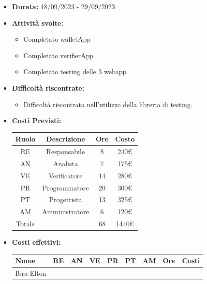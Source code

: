         \begin{itemize}
            \item \textbf{Durata:} 18/09/2023 - 29/09/2023 
            \item \textbf{Attività svolte:}
            \begin{itemize}
                \item Completato walletApp
                \item Completato verifierApp
                \item Completato testing delle 3 webapp 
                
            \end{itemize}
            \item \textbf{Difficoltà riscontrate:}
            \begin{itemize}
                \item Difficoltà riscontrata nell'utilizzo della libreria di testing. 
            \end{itemize}
            \item \textbf{Costi Previsti:}
            \begin{longtable}{|c|c|c|c|}
                \hline
                Ruolo & Descrizione & Ore & Costo \\
                \hline
                RE & Responsabile & 8 & 240€\\
                \hline
                AN & Analista & 7 &  175€\\
                \hline
                VE & Verificatore & 14 & 280€ \\
                \hline
                PR & Programmatore & 20 &  300€\\
                \hline
                PT & Progettista & 13 & 325€ \\
                \hline
                AM & Amministratore & 6 & 120€ \\
                \hline
                Totale & & 68 & 1440€ \\
                \hline
                \end{longtable}
            \item \textbf{Costi effettivi:}
            \begin{longtable}{|p{}|c|c|c|c|c|c|c|c|}
                \hline
                Nome & RE & AN & VE & PR & PT & AM & Ore & Costi\\
                \hline
                Ibra \newline Elton & & & & & & & & \\

\end{longtable}
\end{itemize}
